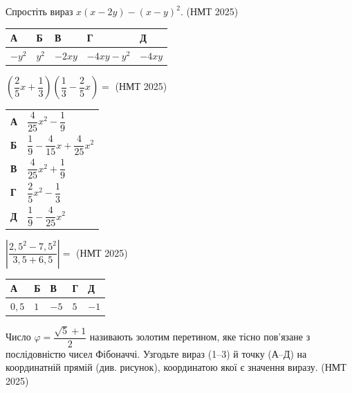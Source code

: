 \documentclass[14pt]{extarticle}
\newcommand{\answerTable}[5]{
\begin{center}
\begin{tabular}{|*{5}{>{\centering\arraybackslash}m{2.8cm}|}}
\hline
\rule[-0.3cm]{0pt}{0.8cm}\textbf{А} & \textbf{Б} & \textbf{В} & \textbf{Г} & \textbf{Д} \\
\hline
\rule[-0.4cm]{0pt}{1.0cm}#1 & \rule[-0.4cm]{0pt}{1.0cm}#2 & \rule[-0.4cm]{0pt}{1.0cm}#3 & \rule[-0.4cm]{0pt}{1.0cm}#4 & \rule[-0.4cm]{0pt}{1.0cm}#5 \\
\hline
\end{tabular}
\end{center}
}
\newcommand{\task}[2]{\noindent\makebox[1.5em][l]{\textbf{#1.}}\parbox[t]{\dimexpr\textwidth-1.5em}{#2}}
\newcommand{\nmtyear}[1]{\hfill{\small\color{yearcolor}(НМТ #1)}}
\begin{document}
\task{22}{Спростіть вираз $x(x - 2y) - (x - y)^2$. \nmtyear{2025}}
\answerTable{$-y^2$}{$y^2$}{$-2xy$}{$-4xy - y^2$}{$-4xy$}
\vspace{0.5cm}
\task{23}{$\left(\dfrac{2}{5}x + \dfrac{1}{3}\right)\left(\dfrac{1}{3} - \dfrac{2}{5}x\right) =$ \nmtyear{2025}}

\vspace{0.2cm}
\begin{tabular}{ll}
\textbf{А} & $\dfrac{4}{25}x^2 - \dfrac{1}{9}$ \\[0.3cm]
\textbf{Б} & $\dfrac{1}{9} - \dfrac{4}{15}x + \dfrac{4}{25}x^2$ \\[0.3cm]
\textbf{В} & $\dfrac{4}{25}x^2 + \dfrac{1}{9}$ \\[0.3cm]
\textbf{Г} & $\dfrac{2}{5}x^2 - \dfrac{1}{3}$ \\[0.3cm]
\textbf{Д} & $\dfrac{1}{9} - \dfrac{4}{25}x^2$ \\
\end{tabular}

\vspace{0.5cm}

\task{24}{$\left|\dfrac{2{,}5^2 - 7{,}5^2}{3{,}5 + 6{,}5}\right| =$ \nmtyear{2025}}
\answerTable{$0{,}5$}{$1$}{$-5$}{$5$}{$-1$}

\vspace{0.5cm}

\task{25}{Число $\varphi = \dfrac{\sqrt{5} + 1}{2}$ називають золотим перетином, яке тісно пов'язане з послідовністю чисел Фібоначчі. Узгодьте вираз (1--3) й точку (А--Д) на координатній прямій (див. рисунок), координатою якої є значення виразу. \nmtyear{2025}}

\vspace{0.3cm}
\begin{center}
\end{center}
\end{document}
